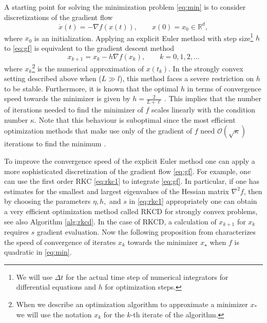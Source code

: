 \documentclass[10pt,a4paper]{article}
\newcommand{\R}{\mathbb{R}}
\renewcommand{\R}{\mathbb{R}}
\begin{document}
 A starting point for solving the minimization problem \eqref{eq:min} is to consider discretizations of the gradient flow
	\begin{equation}\label{eq:gf}
		\dot x(t) = -\nabla f(x(t)), \qquad x(0)=x_0 \in \R^d,
	\end{equation}
	where $x_0$ is an initialization. Applying an explicit Euler method with step size\footnote{We will use $\Delta t$ for the actual time step of numerical integrators for differential equations and $h$ for optimization steps.} $h$ to \eqref{eq:gf} is equivalent to the gradient descent method
	\begin{equation}\label{eq:gradient descent}
		x_{k+1}=x_k-h\nabla f(x_k),\qquad k=0,1,2,...
	\end{equation}
	where $x_k$\footnote{When we describe an optimization algorithm to approximate a minimizer $x_{*}$ we will use the notation $x_{k}$ for the $k$-th iterate of the algorithm.} is the numerical approximation of $x(t_k)$. In the strongly convex setting described above when  ($L\gg l$), this method faces a severe restriction on $h$ to be stable. Furthermore, it is known that the optimal $h$ in terms of convergence speed towards the minimizer is given by {$h=\frac{2}{L+\ell}$ \cite{N18}}.  This implies that the number of iterations needed to find the minimizer of $f$ scales linearly with the condition number $\kappa$. Note that this behaviour is suboptimal since the most efficient optimization methods that make use only of the gradient of $f$ need $\mathcal{O}(\sqrt{\kappa})$ iterations to {find the minimum \cite{N18}}.  

To improve the convergence speed of the explicit Euler method one can apply a more sophisticated discretization of the gradient flow \eqref{eq:gf}. For example, one can use the first order RKC \eqref{eq:rkc1} to integrate  \eqref{eq:gf}. In particular, if one has estimates for the smallest and largest eigenvalues of the Hessian matrix $\nabla^{2} f$, then by choosing the parameters $\eta, h,$ and $s$ in \eqref{eq:rkc1} appropriately one can obtain a very efficient optimization method called RKCD \cite{EVVZ21} for strongly convex problems, see also Algorithm \ref{alg:rkcd}. In the case of RKCD, a calculation of $x_{k+1}$ for $x_{k}$ requires $s$ gradient evaluation. Now the following proposition from \cite{EVVZ21} characterizes the speed of convergence of iterates $x_{k}$ towards the minimizer  $x_{\star}$ when $f$ is quadratic in \eqref{eq:min}.
\end{document}
